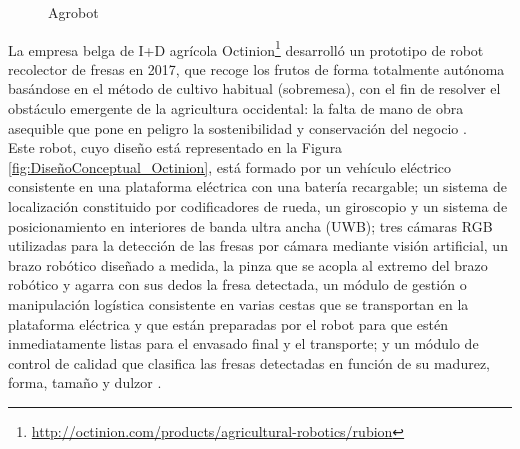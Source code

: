\begin{figure}[H]
    \begin{center}
      \subcapcentertrue
      \hspace{2mm}
    \end{center}
    \caption{Agrobot}
    \label{fig:Agrobot}
  \end{figure}

\pagebreak
La empresa belga de I+D agrícola Octinion\footnote{\url{http://octinion.com/products/agricultural-robotics/rubion}} desarrolló un prototipo de robot recolector de fresas en 2017, que recoge los frutos de forma totalmente autónoma basándose en el método de cultivo habitual (sobremesa), con el fin de resolver el obstáculo emergente de la agricultura occidental: la falta de mano de obra asequible que pone en peligro la sostenibilidad y conservación del negocio \cite{DePreter18}.\\

Este robot, cuyo diseño está representado en la Figura \ref{fig:DiseñoConceptual_Octinion}, está formado por un vehículo eléctrico consistente en una plataforma eléctrica con una batería recargable; un sistema de localización constituido por codificadores de rueda, un giroscopio y un sistema de posicionamiento en interiores de banda ultra ancha (UWB); tres cámaras RGB utilizadas para la detección de las fresas por cámara mediante visión artificial, un brazo robótico diseñado a medida, la pinza que se acopla al extremo del brazo robótico y agarra con sus dedos la fresa detectada, un módulo de gestión o manipulación logística consistente en varias cestas que se transportan en la plataforma eléctrica y que están preparadas por el robot para que estén inmediatamente listas para el envasado final y el transporte; y un módulo de control de calidad que clasifica las fresas detectadas en función de su madurez, forma, tamaño y dulzor \cite{DePreter18}.

